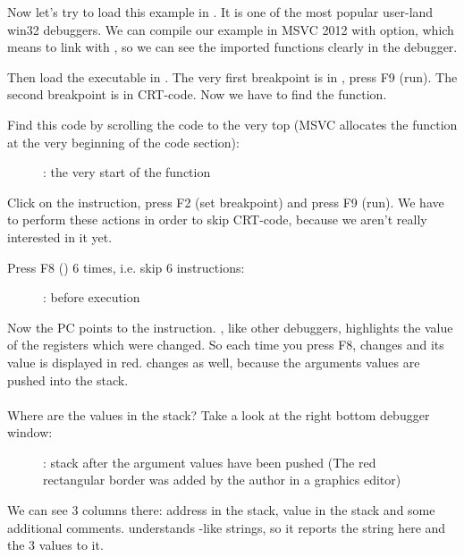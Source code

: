 Now let's try to load this example in \olly.
It is one of the most popular user-land win32 debuggers.
We can compile our example in MSVC 2012 with  option, which means to link with ,
so we can see the imported functions clearly in the debugger.

Then load the executable in \olly.
The very first breakpoint is in , press 
F9 (run).
The second breakpoint is in \ac{CRT}-code.
Now we have to find the \main function.

Find this code by scrolling the code to the very top (MSVC allocates the \main function at the very beginning of the code section): 
\begin{figure}[H]
\centering
{}
\caption{\olly: the very start of the \main function}
\label{fig:printf3_olly_1}
\end{figure}

Click on the  instruction, press F2 (set breakpoint) and press F9 (run).
We have to perform these actions in order to skip \ac{CRT}-code, because we aren't really interested in it yet.

\clearpage
Press F8 (\stepover) 6 times, i.e. skip 6 instructions:

\begin{figure}[H]
\centering
{}
\caption{\olly: before \printf execution}
\label{fig:printf3_olly_2}
\end{figure}

Now the \ac{PC} points to the  instruction.
\olly, like other debuggers, highlights the value of the registers which were changed.
So each time you press F8, \EIP changes and its value is displayed in red.
\ESP changes as well, because the arguments values are pushed into the stack.\\
\\
Where are the values in the stack?
Take a look at the right bottom debugger window:

\begin{figure}[H]
\centering

\caption{\olly: stack after the argument values have been pushed (The red rectangular border was added by the author in a graphics editor)}
\end{figure}

We can see 3 columns there: address in the stack, value in the stack and some additional \olly comments. 
\olly understands \printf{}-like strings, so it reports the string here and the 3 values  to it.

